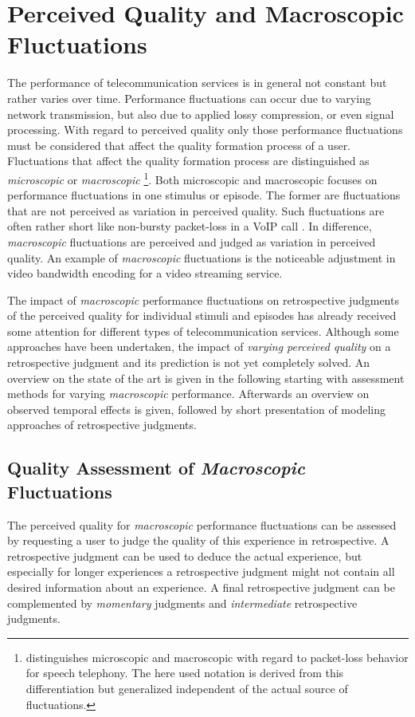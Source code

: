 \section{Perceived Quality and Macroscopic Fluctuations}\label{chap:04}
The performance of telecommunication services is in general not constant but rather varies over time.
Performance fluctuations can occur due to varying network transmission, but also due to applied lossy compression, or even signal processing.
With regard to perceived quality only those performance fluctuations must be considered that affect the quality formation process of a user.
Fluctuations that affect the quality formation process are distinguished as \emph{microscopic} or \emph{macroscopic} \citep[\cf,][p.~72]{raake_short-_2006}
\footnote{\citet{raake_short-_2006} distinguishes microscopic and macroscopic with regard to packet-loss behavior for speech telephony. The here used notation is derived from this differentiation but generalized independent of the actual source of fluctuations.}.
Both microscopic and macroscopic focuses on performance fluctuations in one stimulus or episode.
The former are fluctuations that are not perceived as variation in perceived quality.
Such fluctuations are often rather short like non-bursty packet-loss in a \ac{VoIP} call \citep[\cf,][p.~72]{raake_short-_2006}.
In difference, \emph{macroscopic} fluctuations are perceived and judged as variation in perceived quality.
An example of \emph{macroscopic} fluctuations is the noticeable adjustment in video bandwidth encoding for a video streaming service.

The impact of \emph{macroscopic} performance fluctuations on retrospective judgments of the perceived quality for individual stimuli and episodes has already received some attention for different types of telecommunication services.
Although some approaches have been undertaken, the impact of \emph{varying perceived quality} on a retrospective judgment and its prediction is not yet completely solved.
An overview on the state of the art is given in the following starting with assessment methods for varying \emph{macroscopic} performance.
Afterwards an overview on observed temporal effects is given, followed by short presentation of modeling approaches of retrospective judgments.

\subsection{Quality Assessment of \emph{Macroscopic} Fluctuations}
The perceived quality for \emph{macroscopic} performance fluctuations can be assessed by requesting a user to judge the quality of this experience in retrospective.
A retrospective judgment can be used to deduce the actual experience, but especially for longer experiences a retrospective judgment might not contain all desired information about an experience.
A final retrospective judgment can be complemented by \emph{momentary} judgments and \emph{intermediate} retrospective judgments.

